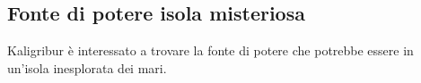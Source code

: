 \subsection{Fonte di potere isola misteriosa}
Kaligribur \`e interessato a trovare la fonte di potere che potrebbe essere in un'isola
inesplorata dei mari.
